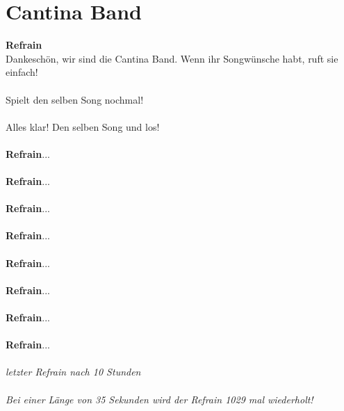 \documentclass[twoside,8pt]{scrartcl}
\begin{document}
\clearpage
\section{Cantina Band}
\textbf{Refrain}\\
Dankeschön, wir sind die Cantina Band. Wenn ihr Songwünsche habt, ruft sie einfach!\\\\
Spielt den selben Song nochmal! \\\\
Alles klar! Den selben Song und los!\\\\
\textbf{Refrain}...\\\\
\textbf{Refrain}...\\\\
\textbf{Refrain}...\\\\
\textbf{Refrain}...\\\\
\textbf{Refrain}...\\\\
\textbf{Refrain}...\\\\
\textbf{Refrain}...\\\\
\textbf{Refrain}...\\\\
\textit{letzter Refrain nach 10 Stunden\\\\
	Bei einer Länge von 35 Sekunden wird der Refrain 1029 mal wiederholt!}
\clearpage
\end{document}
